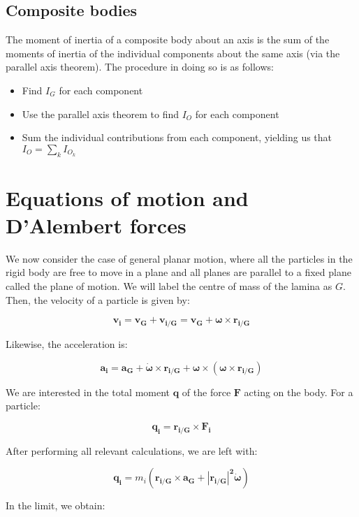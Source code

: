 \documentclass[12pt]{article}
\begin{document}
\subsection{Composite bodies}

The moment of inertia of a composite body about an axis is the sum of the moments of inertia of the individual components about the same axis (via the parallel axis theorem). The procedure in doing so is as follows:

\begin{itemize}
    \item Find $I_G$ for each component
    \item Use the parallel axis theorem to find $I_O$ for each component
    \item Sum the individual contributions from each component, yielding us that $I_O = \sum_k I_{O_k}$
\end{itemize}

\newpage

\section{Equations of motion and D'Alembert forces}

We now consider the case of general planar motion, where all the particles in the rigid body are free to move in a plane and all planes are parallel to a fixed plane called the plane of motion. We will label the centre of mass of the lamina as $G$. Then, the velocity of a particle is given by:

\[ \mathbf{v_i} = \mathbf{v_G} + \mathbf{v_{i/G}} = \mathbf{v_G} + \mathbf{\omega} \times \mathbf{r_{i/G
}} \]

Likewise, the acceleration is:

\[ \mathbf{a_i} = \mathbf{a_G} + \dot{\mathbf{\omega}} \times \mathbf{r_{i/G}} + \mathbf{\omega} \times (\mathbf{\omega} \times \mathbf{r_{i/G}}) \]

We are interested in the total moment $\mathbf{q}$ of the force $\mathbf{F}$ acting on the body. For a particle:

\[ \mathbf{q_i} = \mathbf{r_{i/G}} \times \mathbf{F_i} \]

After performing all relevant calculations, we are left with:

\[ \mathbf{q_i} = m_i\left(\mathbf{r_{i/G} \times \mathbf{a_G} + \left|\mathbf{r_{i/G}}\right|^2\dot{\mathbf{\omega}}}\right) \]

In the limit, we obtain:
\end{document}
